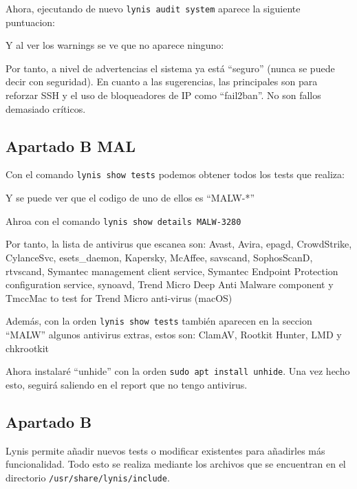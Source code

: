 \documentclass{article}
\begin{document}
Ahora, ejecutando de nuevo \verb|lynis audit system| aparece la siguiente puntuacion:


Y al ver los warnings se ve que no aparece ninguno:


Por tanto, a nivel de advertencias el sistema ya está ``seguro'' (nunca se puede decir con seguridad). En cuanto a las sugerencias, las principales son para reforzar SSH y el uso de bloqueadores de IP como ``fail2ban''. No son fallos demasiado críticos.

\subsection*{Apartado B MAL}
Con el comando \verb|lynis show tests| podemos obtener todos los tests que realiza:


Y se puede ver que el codigo de uno de ellos es ``MALW-*''

Ahroa con el comando \verb|lynis show details MALW-3280|

Por tanto, la lista de antivirus que escanea son: Avast, Avira, epagd, CrowdStrike, CylanceSvc, esets\_daemon, Kapersky, McAffee, savscand, SophosScanD, rtvscand, Symantec management client service, Symantec Endpoint Protection configuration service, synoavd, Trend Micro Deep Anti Malware component y TmccMac to test for Trend Micro anti-virus (macOS)

Además, con la orden \verb|lynis show tests| también aparecen en la seccion ``MALW'' algunos antivirus extras, estos son: ClamAV, Rootkit Hunter, LMD y chkrootkit



Ahora instalaré ``unhide'' con la orden \verb|sudo apt install unhide|. Una vez hecho esto, seguirá saliendo en el report que no tengo antivirus.


\subsection*{Apartado B}
Lynis permite añadir nuevos tests o modificar existentes para añadirles más funcionalidad. Todo esto se realiza mediante los archivos que se encuentran en el directorio \verb|/usr/share/lynis/include|.
\end{document}
